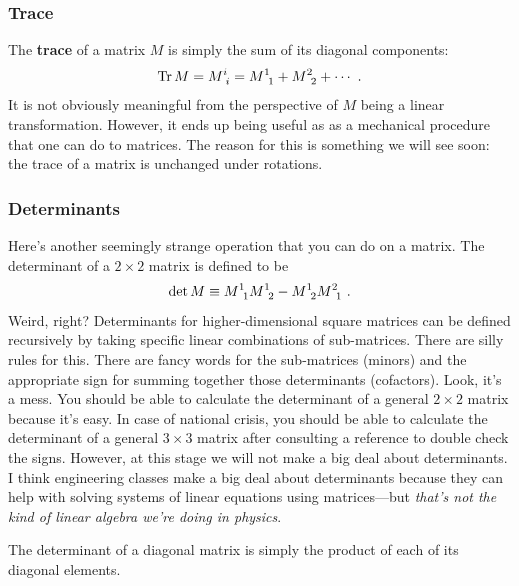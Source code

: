 \documentclass[12pt]{article}
\begin{document}
\subsubsection*{Trace}

The \textbf{trace} of a matrix $M$ is simply the sum of its diagonal components:
\begin{align}
    \Tr M = M\aij{i}{i} = M\aij{1}{1} + M\aij{2}{2} + \cdots \ .
\end{align}
It is not obviously meaningful from the perspective of $M$ being a linear transformation. However, it ends up being useful as as a mechanical procedure that one can do to matrices. The reason for this is something we will see soon: the trace of a matrix is unchanged under rotations. 

\subsubsection*{Determinants}

Here's another seemingly strange operation that you can do on a matrix. The determinant of a $2\times 2$ matrix is defined to be
\begin{align}
    \det M \equiv M\aij11 M\aij12 - M\aij12 M\aij21 \ .
\end{align}
Weird, right? Determinants for higher-dimensional square matrices can be defined recursively by taking specific linear combinations of sub-matrices. There are silly rules for this. There are fancy words for the sub-matrices (minors) and the appropriate sign for summing together those determinants (cofactors). Look, it's a mess. You should be able to calculate the determinant of a general $2\times 2$ matrix because it's easy. In case of national crisis, you should be able to calculate the determinant of a general $3\times 3$ matrix after consulting a reference to double check the signs. However, at this stage we will not make a big deal about determinants. I think engineering classes make a big deal about determinants because they can help with solving systems of linear equations using matrices---but \emph{that's not the kind of linear algebra we're doing in physics}.

\begin{example}
The determinant of a diagonal matrix is simply the product of each of its diagonal elements. 
\end{example}
\end{document}

